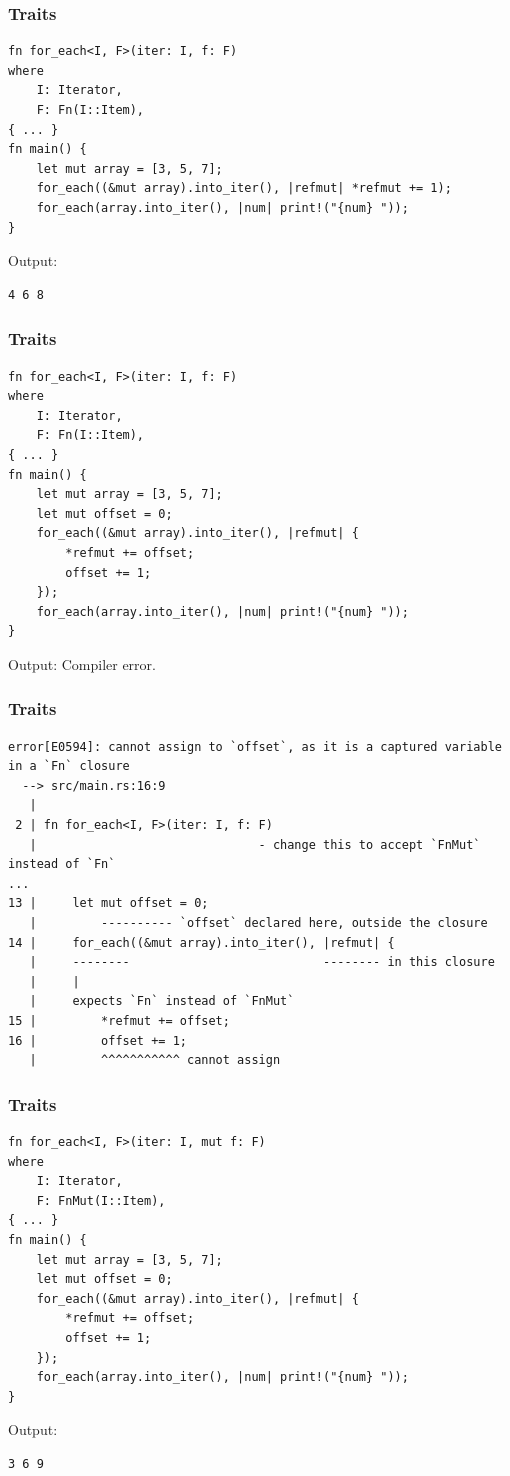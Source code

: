 \begin{frame}[fragile]
    \frametitle{Traits}
    \begin{verbatim}
fn for_each<I, F>(iter: I, f: F)
where
    I: Iterator,
    F: Fn(I::Item),
{ ... }
fn main() {
    let mut array = [3, 5, 7];
    for_each((&mut array).into_iter(), |refmut| *refmut += 1);
    for_each(array.into_iter(), |num| print!("{num} "));
}
    \end{verbatim}
    \vfill
    Output:
    \pause
    \begin{verbatim}
4 6 8
    \end{verbatim}
\end{frame}

\begin{frame}[fragile]
    \frametitle{Traits}
    \begin{verbatim}
fn for_each<I, F>(iter: I, f: F)
where
    I: Iterator,
    F: Fn(I::Item),
{ ... }
fn main() {
    let mut array = [3, 5, 7];
    let mut offset = 0;
    for_each((&mut array).into_iter(), |refmut| {
        *refmut += offset;
        offset += 1;
    });
    for_each(array.into_iter(), |num| print!("{num} "));
}
    \end{verbatim}
    \vfill
    Output:
    \pause
    \vfill
    Compiler error.
\end{frame}

\begin{frame}[fragile]
    \frametitle{Traits}
    \begin{verbatim}
error[E0594]: cannot assign to `offset`, as it is a captured variable in a `Fn` closure
  --> src/main.rs:16:9
   |
 2 | fn for_each<I, F>(iter: I, f: F)
   |                               - change this to accept `FnMut` instead of `Fn`
...
13 |     let mut offset = 0;
   |         ---------- `offset` declared here, outside the closure
14 |     for_each((&mut array).into_iter(), |refmut| {
   |     --------                           -------- in this closure
   |     |
   |     expects `Fn` instead of `FnMut`
15 |         *refmut += offset;
16 |         offset += 1;
   |         ^^^^^^^^^^^ cannot assign
    \end{verbatim}
\end{frame}

\begin{frame}[fragile]
    \frametitle{Traits}
    \begin{verbatim}
fn for_each<I, F>(iter: I, mut f: F)
where
    I: Iterator,
    F: FnMut(I::Item),
{ ... }
fn main() {
    let mut array = [3, 5, 7];
    let mut offset = 0;
    for_each((&mut array).into_iter(), |refmut| {
        *refmut += offset;
        offset += 1;
    });
    for_each(array.into_iter(), |num| print!("{num} "));
}
    \end{verbatim}
    \vfill
    Output:
    \pause
    \vfill
    \begin{verbatim}
3 6 9
    \end{verbatim}
\end{frame}

